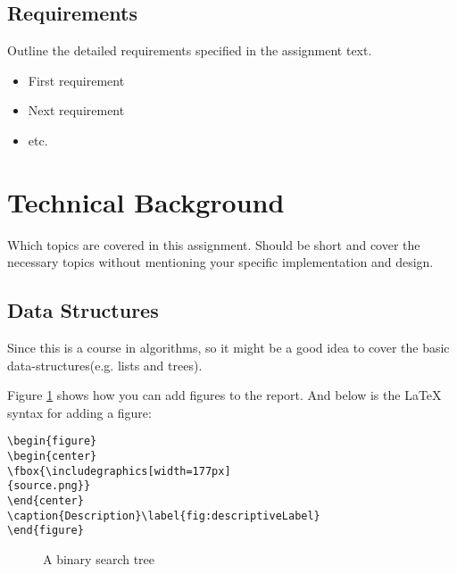 \subsection{Requirements}

Outline the detailed requirements specified in the assignment text.

\begin{itemize}

\item First requirement
\item Next requirement
\item etc.

\end{itemize}


\section{Technical Background}

Which topics are covered in this assignment. Should be short and cover the necessary topics without mentioning your specific implementation and design.

\subsection{Data Structures}

Since this is a course in algorithms, so it might be a good idea to cover the basic data-structures(e.g. lists and trees). 

Figure \ref{fig:ackseq} shows how you can add figures to the report. And below is the LaTeX syntax for adding a figure:

\begin{verbatim}
\begin{figure}
\begin{center}
\fbox{\includegraphics[width=177px]
{source.png}}
\end{center}
\caption{Description}\label{fig:descriptiveLabel}
\end{figure}
\end{verbatim}

\begin{figure}[h]
\begin{center}
\end{center}
\caption{A binary search tree}\label{fig:ackseq}
\end{figure}

